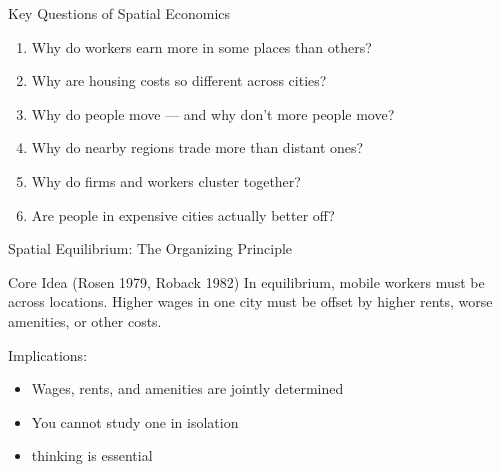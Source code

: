 \documentclass{beamer}
\begin{document}
\begin{frame}{Key Questions of Spatial Economics}

    \begin{enumerate}
        \item {} Why do workers earn more in some places than others?
        \item {} Why are housing costs so different across cities?
        \item {} Why do people move --- and why don't more people move?
        \item {} Why do nearby regions trade more than distant ones?
        \item {} Why do firms and workers cluster together?
        \item {} Are people in expensive cities actually better off?
    \end{enumerate}

    \vspace{0.5em}

\end{frame}

\begin{frame}{Spatial Equilibrium: The Organizing Principle}

    \begin{exampleblock}{Core Idea (Rosen 1979, Roback 1982)}
        In equilibrium, mobile workers must be  across locations. Higher wages in one city must be offset by higher rents, worse amenities, or other costs.
    \end{exampleblock}

    \vspace{1em}
    Implications:
    \begin{itemize}
        \item Wages, rents, and amenities are jointly determined
        \item You cannot study one in isolation
        \item {} thinking is essential
    \end{itemize}

    \vspace{0.5em}

\end{frame}
\end{document}
